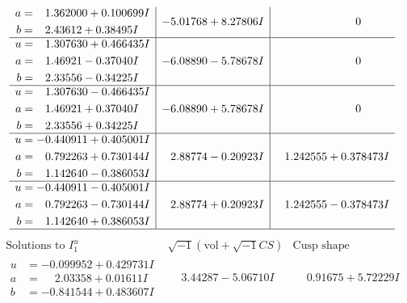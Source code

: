 \documentclass[1p]{elsarticle_modified}
\theoremstyle{definition}
\newcommand{\I}{\sqrt{-1}}
\begin{document}
$$\begin{array}{c|c|c}
\begin{aligned}
a &= \phantom{-}1.362000 + 0.100699 I \\
b &= \phantom{-}2.43612 + 0.38495 I\end{aligned}
 & -5.01768 + 8.27806 I & \phantom{-0.000000 } 0 \\ \hline\begin{aligned}
u &= \phantom{-}1.307630 + 0.466435 I \\
a &= \phantom{-}1.46921 - 0.37040 I \\
b &= \phantom{-}2.33556 - 0.34225 I\end{aligned}
 & -6.08890 - 5.78678 I & \phantom{-0.000000 } 0 \\ \hline\begin{aligned}
u &= \phantom{-}1.307630 - 0.466435 I \\
a &= \phantom{-}1.46921 + 0.37040 I \\
b &= \phantom{-}2.33556 + 0.34225 I\end{aligned}
 & -6.08890 + 5.78678 I & \phantom{-0.000000 } 0 \\ \hline\begin{aligned}
u &= -0.440911 + 0.405001 I \\
a &= \phantom{-}0.792263 + 0.730144 I \\
b &= \phantom{-}1.142640 - 0.386053 I\end{aligned}
 & \phantom{-}2.88774 - 0.20923 I & \phantom{-}1.242555 + 0.378473 I \\ \hline\begin{aligned}
u &= -0.440911 - 0.405001 I \\
a &= \phantom{-}0.792263 - 0.730144 I \\
b &= \phantom{-}1.142640 + 0.386053 I\end{aligned}
 & \phantom{-}2.88774 + 0.20923 I & \phantom{-}1.242555 - 0.378473 I\\
 \hline 
 \end{array}$$\newpage$$\begin{array}{c|c|c}  
\text{Solutions to }I^u_{1}& \I (\text{vol} + \sqrt{-1}CS) & \text{Cusp shape}\\
 \hline 
\begin{aligned}
u &= -0.099952 + 0.429731 I \\
a &= \phantom{-}2.03358 + 0.01611 I \\
b &= -0.841544 + 0.483607 I\end{aligned}
 & \phantom{-}3.44287 - 5.06710 I & \phantom{-}0.91675 + 5.72229 I \\ \hline\begin{aligned}

\end{aligned}
\end{array}$$
\end{document}

